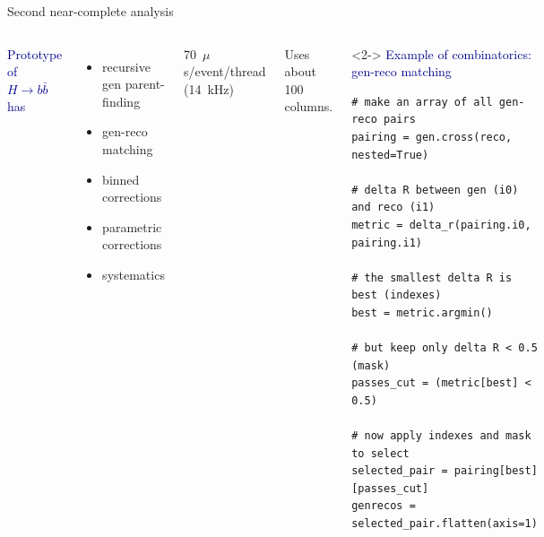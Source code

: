\documentclass[aspectratio=169]{beamer}
\begin{document}
\begin{frame}[fragile]{Second near-complete analysis}
\vspace{0.5 cm}
\begin{columns}[t]
\textcolor{darkblue}{Prototype of $H \to b\bar{b}$ has}
\begin{itemize}
\item recursive gen parent-finding
\item gen-reco matching
\item binned corrections
\item parametric corrections
\item systematics
\end{itemize}

\large
\vspace{0.25 cm}
70~$\mu$s/event/thread (14~kHz)

\vspace{0.25 cm}
Uses about 100 columns.

\begin{uncoverenv}<2->
\textcolor{darkblue}{\hspace{-0.15 cm}Example of combinatorics: gen-reco matching}

\small
\begin{verbatim}
# make an array of all gen-reco pairs
pairing = gen.cross(reco, nested=True)

# delta R between gen (i0) and reco (i1)
metric = delta_r(pairing.i0, pairing.i1)

# the smallest delta R is best (indexes)
best = metric.argmin()

# but keep only delta R < 0.5 (mask)
passes_cut = (metric[best] < 0.5)

# now apply indexes and mask to select
selected_pair = pairing[best][passes_cut]
genrecos = selected_pair.flatten(axis=1)
\end{verbatim}
\end{uncoverenv}
\end{columns}
\end{frame}
\end{document}
